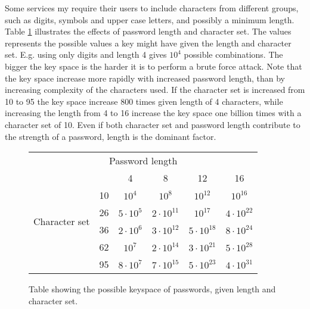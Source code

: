 \par Some services my require their users to include characters from different groups, such as digits, symbols and upper case letters, and possibly a minimum length. Table \ref{pw-strength} illustrates the effects of password length and character set. The values represents the possible values a key might have given the length and character set. E.g. using only digits and length 4 gives $10^4$ possible combinations. The bigger the key space is the harder it is to perform a brute force attack. Note that the key space increase more rapidly with increased password length, than by increasing complexity of the characters used. If the character set is increased from 10 to 95 the key space increase 800 times given length of 4 characters, while increasing the length from 4 to 16 increase the key space one billion times with a character set of 10. Even if both character set and password length contribute to the strength of a password, length is the dominant factor.



\begin{figure}
    \centering
    \begin{tabular}{c|c|c|c|c|c|}
    \multicolumn{6}{c}{Password length}\\\cline{2-6}
    \multirow{6}{*}{\begin{sideways}Character set\end{sideways}}
      &\cellcolor{Gray}&\cellcolor{Gray}4&\cellcolor{Gray}8&\cellcolor{Gray}12&\cellcolor{Gray}16\\\cline{2-6}
    &\cellcolor{Gray}10&$10^4$&$10^8$&$10^{12}$&$10^{16}$\\\cline{2-6}
    &\cellcolor{Gray}26&$5\cdot10^5$&$2\cdot10^{11}$&$10^{17}$&$4\cdot10^{22}$\\\cline{2-6}
    &\cellcolor{Gray}36&$2\cdot 10^6$&$3\cdot10^{12}$&$5\cdot10^{18}$&$8\cdot10^{24}$\\\cline{2-6}
    &\cellcolor{Gray}62&$10^7$&$2\cdot10^{14}$&$3\cdot10^{21}$&$5\cdot10^{28}$\\\cline{2-6}
    &\cellcolor{Gray}95&$8\cdot10^7$&$7\cdot10^{15}$&$5\cdot10^{23}$&$4\cdot10^{31}$\\\cline{2-6}
    \end{tabular}
    \caption{\cite{nist-guide} Table showing the possible keyspace of passwords, given length and character set. }
    \label{pw-strength}

\end{figure}


